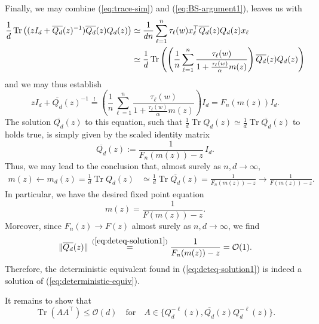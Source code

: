 \documentclass{article}
\begin{document}
\bigskip
\par
Finally, we may combine (\ref{eq:trace-sim}) and (\ref{eq:BS-argument1}), leaves us with
\begin{align}
\frac{1}{d}\operatorname{Tr}\left((zI_d+\overline{Q_d}(z)^{-1})\overline{Q_d}(z)Q_d(z)\right) &\simeq \frac{1}{dn}\sum_{\ell=1}^n\tau_\ell(w) x_\ell^\top\overline{Q_d}(z)Q_d(z)x_\ell
\\ &\simeq \frac{1}{d}\operatorname{Tr}\left(\left(\frac{1}{n}\sum_{\ell=1}^n\frac{\tau_\ell(w)}{1+\frac{\tau_\ell(w)}{\alpha}m(z)}\right)\overline{Q_d}(z)Q_d(z)\right) \notag
\end{align}
and we may thus establish
\begin{equation}
zI_d+\overline{Q_d}(z)^{-1}\stackrel{!}{=}\left(\frac{1}{n}\sum_{\ell=1}^n\frac{\tau_\ell(w)}{1+\frac{\tau_\ell(w)}{\alpha}m(z)}\right)I_d=F_n(m(z))I_d.
\end{equation}
The solution $\overline{Q_d}(z)$ to this equation, such that $\frac{1}{d}\operatorname{Tr}Q_d(z)\simeq\frac{1}{d}\operatorname{Tr}\overline{Q_d}(z)$ to holds true, is simply given by the scaled identity matrix
\begin{equation}
\overline{Q_d}(z):=\frac{1}{F_n(m(z))-z}\,I_d.\label{eq:deteq-solution1}
\end{equation}
Thus, we may lead to the conclusion that, almost surely as $n,d\to\infty$,
\begin{align}
m(z)\leftarrow m_d(z)=\frac{1}{d}\operatorname{Tr}Q_d(z) &\simeq\frac{1}{d}\operatorname{Tr}\overline{Q_d}(z) = \frac{1}{F_n(m(z))-z}\to\frac{1}{F(m(z))-z}.
\end{align}
In particular, we have the desired fixed point equation
\begin{equation}
m(z)=\frac{1}{F(m(z))-z}.
\end{equation}
Moreover, since $F_n(z)\to F(z)$ almost surely as $n,d\to\infty$, we find
\begin{equation}
\|\overline{Q_d}(z)\|\,\stackrel{(\ref{eq:deteq-solution1})}{=}\frac{1}{F_n(m(z))-z}=\mathcal{O}(1).\label{eq:deteq-bound1}
\end{equation}
Therefore, the deterministic equivalent found in (\ref{eq:deteq-solution1}) is indeed a solution of (\ref{eq:deterministic-equiv}).
\bigskip
\par
It remains to show that 
\begin{equation}
\operatorname{Tr}(AA^\top)\leq\mathcal{O}(d)\quad\text{for}\quad A\in\{Q_d^{-\ell}(z),\overline{Q_d}(z)Q_d^{-\ell}(z)\}.
\end{equation}
\end{document}
